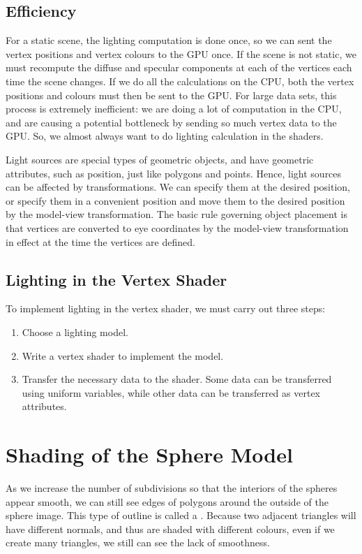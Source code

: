 \documentclass[../COS3712_Notes.tex]{subfiles}
\begin{document}
      \subsection{Efficiency}
        For a static scene, the lighting computation is done once, so we can sent the vertex
        positions and vertex colours to the GPU once.
        If the scene is not static, we must recompute the diffuse and specular components
        at each of the vertices each time the scene changes.
        If we do all the calculations on the CPU, both the vertex positions and colours
        must then be sent to the GPU.
        For large data sets, this process is extremely inefficient:
        we are doing a lot of computation in the CPU, and are causing a potential bottleneck
        by sending so much vertex data to the GPU.
        So, we almost always want to do lighting calculation in the shaders.

        Light sources are special types of geometric objects, and have geometric attributes,
        such as position, just like polygons and points.
        Hence, light sources can be affected by transformations.
        We can specify them at the desired position, or specify them in a convenient position
        and move them to the desired position by the model-view transformation.
        The basic rule governing object placement is that vertices are converted to eye
        coordinates by the model-view transformation in effect at the time the vertices
        are defined.

      \subsection{Lighting in the Vertex Shader}
        To implement lighting in the vertex shader, we must carry out three steps:
        \begin{enumerate}
          \item Choose a lighting model.
          \item Write a vertex shader to implement the model.
          \item Transfer the necessary data to the shader.
            Some data can be transferred using uniform variables,
            while other data can be transferred as vertex attributes.
        \end{enumerate}

    \section{Shading of the Sphere Model}
      As we increase the number of subdivisions so that the interiors of the spheres
      appear smooth, we can still see edges of polygons around the outside of the sphere image.
      This type of outline is called a .
      Because two adjacent triangles will have different normals, and thus are shaded with
      different colours, even if we create many triangles, we still can see the lack of smoothness.
\end{document}
